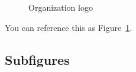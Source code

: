 \documentclass[
  letterpaper,
  oneside,
  openany]{MastersDoctoralThesis}
\theoremstyle{plain}
\theoremstyle{remark}
\begin{document}
\begin{figure}


\caption{\label{fig-logo3}Organization logo}

\end{figure}%

You can reference this as Figure~\ref{fig-logo3}.

\subsection*{Subfigures}\label{subfigures}
\end{document}
